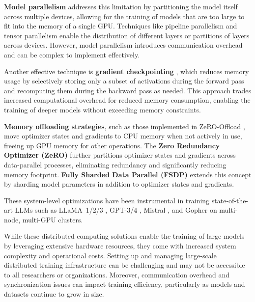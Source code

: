 \textbf{Model parallelism} addresses this limitation by partitioning the model itself across multiple devices, allowing for the training of models that are too large to fit into the memory of a single GPU. Techniques like pipeline parallelism \citep{huangGPipeEfficientTraining2019} and tensor parallelism \citep{shoeybiMegatronLMTuningScaling2019} enable the distribution of different layers or partitions of layers across devices. However, model parallelism introduces communication overhead and can be complex to implement effectively.

Another effective technique is \textbf{gradient checkpointing} \citep{chenTrainingDeepNets2016}, which reduces memory usage by selectively storing only a subset of activations during the forward pass and recomputing them during the backward pass as needed. This approach trades increased computational overhead for reduced memory consumption, enabling the training of deeper models without exceeding memory constraints.

\textbf{Memory offloading strategies}, such as those implemented in ZeRO-Offload \citep{rajbhandariZeROMemoryOptimizations2020}, move optimizer states and gradients to CPU memory when not actively in use, freeing up GPU memory for other operations. The \textbf{Zero Redundancy Optimizer (ZeRO)} \citep{rajbhandariZeROMemoryOptimizations2020} further partitions optimizer states and gradients across data-parallel processes, eliminating redundancy and significantly reducing memory footprint. \textbf{Fully Sharded Data Parallel (FSDP)} \citep{zhaoExtendingTorchElasticStateful2020} extends this concept by sharding model parameters in addition to optimizer states and gradients.

 These system-level optimizations have been instrumental in training state-of-the-art LLMs such as LLaMA~1/2/3 \citep{touvronLlamaOpenFoundation2023}, GPT-3/4 \citep{brownLanguageModelsAre2020}, Mistral \citep{jiangMistralEfficientComposable2023}, and Gopher \citep{raeScalingLanguageModels2021} on multi-node, multi-GPU clusters.

While these distributed computing solutions enable the training of large models by leveraging extensive hardware resources, they come with increased system complexity and operational costs. Setting up and managing large-scale distributed training infrastructure can be challenging and may not be accessible to all researchers or organizations. Moreover, communication overhead and synchronization issues can impact training efficiency, particularly as models and datasets continue to grow in size.

